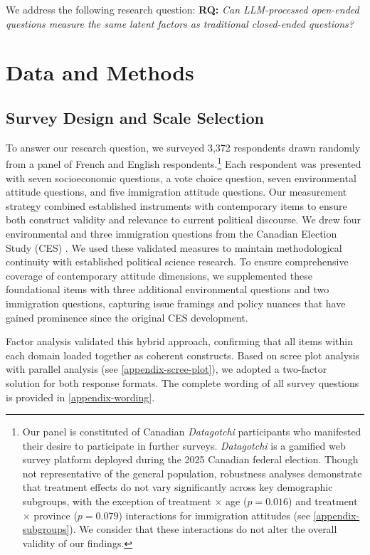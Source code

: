 \documentclass[
  journal=ram,
  manuscript=article-type,
  year=2025,
  volume=unpublished,
]{cup-journal}
\begin{document}
We address the following research question:
\textbf{RQ:}
\textit{Can LLM-processed open-ended questions measure the same latent factors as traditional closed-ended questions?}

\section{Data and Methods}

\subsection{Survey Design and Scale Selection}

To answer our research question, we surveyed 3,372 respondents drawn randomly from a panel of French and English respondents.\footnote{Our panel is constituted of Canadian \textit{Datagotchi} participants who manifested their desire to participate in further surveys.
\textit{Datagotchi} is a gamified web survey platform deployed during the 2025 Canadian federal election.
Though not representative of the general population, robustness analyses demonstrate that treatment effects do not vary significantly across key demographic subgroups, with the exception of treatment × age ($p = 0.016$) and treatment × province ($p = 0.079$) interactions for immigration attitudes (see \ref{appendix-subgroups}).
We consider that these interactions do not alter the overall validity of our findings.}
Each respondent was presented with seven socioeconomic questions, a vote choice question, seven environmental attitude questions, and five immigration attitude questions.
Our measurement strategy combined established instruments with contemporary items to ensure both construct validity and relevance to current political discourse.
We drew four environmental and three immigration questions from the Canadian Election Study (CES) \citep{stephenson_etal22}.
We used these validated measures to maintain methodological continuity with established political science research.
To ensure comprehensive coverage of contemporary attitude dimensions, we supplemented these foundational items with three additional environmental questions and two immigration questions, capturing issue framings and policy nuances that have gained prominence since the original CES development.

Factor analysis validated this hybrid approach, confirming that all items within each domain loaded together as coherent constructs. Based on scree plot analysis with parallel analysis (see \ref{appendix-scree-plot}), we adopted a two-factor solution for both response formats. The complete wording of all survey questions is provided in \ref{appendix-wording}.
\end{document}
